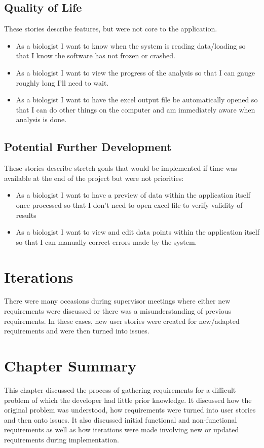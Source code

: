 \documentclass{l4proj}
\begin{document}
\subsection{Quality of Life}
These stories describe  features, but were not core to the application.
\begin{itemize}
    \item As a biologist I want to know when the system is reading data/loading so that I know the software has not frozen or crashed.
    \item As a biologist I want to view the progress of the analysis so that I can gauge roughly long I'll need to wait.
    \item As a biologist I want to have the excel output file be automatically opened so that I can do other things on the computer and am immediately aware when analysis is done.
    
\end{itemize}

\subsection{Potential Further Development}
These stories describe stretch goals that would be implemented if time was available at the end of the project but were not priorities:
\begin{itemize}
    \item As a biologist I want to have a preview of data within the application itself once processed so that I don't need to open excel file to verify validity of results
    \item As a biologist I want to view and edit data points within the application itself so that I can manually correct errors made by the system.
\end{itemize}

\section{Iterations}
There were many occasions during supervisor meetings where either new requirements were discussed or there was a misunderstanding of previous requirements. In these cases, new user stories were created for new/adapted requirements and were then turned into issues.

\section{Chapter Summary}
This chapter discussed the process of gathering requirements for a difficult problem of which the developer had little prior knowledge. It discussed how the original problem was understood, how requirements were turned into user stories and then onto issues. It also discussed initial functional and non-functional requirements as well as how iterations were made involving new or updated requirements during implementation.
\end{document}
